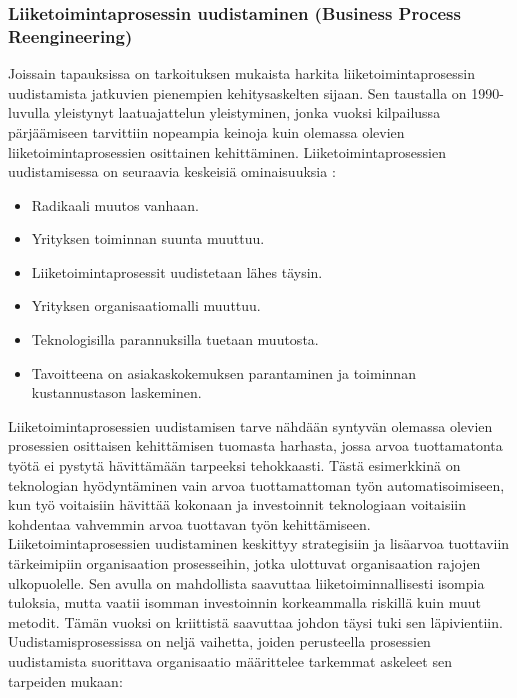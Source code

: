 \documentclass[finnish,12pt,a4paper,pdftex]{article}
\begin{document}
\subsubsection{Liiketoimintaprosessin uudistaminen (Business Process Reengineering)}

Joissain tapauksissa on tarkoituksen mukaista harkita liiketoimintaprosessin uudistamista jatkuvien pienempien kehitysaskelten sijaan. Sen taustalla on 1990-luvulla yleistynyt laatuajattelun yleistyminen, jonka vuoksi kilpailussa pärjäämiseen tarvittiin nopeampia keinoja kuin olemassa olevien liiketoimintaprosessien osittainen kehittäminen. Liiketoimintaprosessien uudistamisessa on seuraavia keskeisiä ominaisuuksia \citep{mohapatra}:

\begin{itemize}
\setlength{\itemsep}{0pt}
    \item Radikaali muutos vanhaan.
    \item Yrityksen toiminnan suunta muuttuu.
    \item Liiketoimintaprosessit uudistetaan lähes täysin.
    \item Yrityksen organisaatiomalli muuttuu.
    \item Teknologisilla parannuksilla tuetaan muutosta.
    \item Tavoitteena on asiakaskokemuksen parantaminen ja toiminnan kustannustason laskeminen.
\end{itemize}

Liiketoimintaprosessien uudistamisen tarve nähdään syntyvän olemassa olevien prosessien osittaisen kehittämisen tuomasta harhasta, jossa arvoa tuottamatonta työtä ei pystytä hävittämään tarpeeksi tehokkaasti. Tästä esimerkkinä on teknologian hyödyntäminen vain arvoa tuottamattoman työn automatisoimiseen, kun työ voitaisiin hävittää kokonaan ja investoinnit teknologiaan voitaisiin kohdentaa vahvemmin arvoa tuottavan työn kehittämiseen. \citep{hammer}\\

Liiketoimintaprosessien uudistaminen keskittyy strategisiin ja lisäarvoa tuottaviin tärkeimipiin organisaation prosesseihin, jotka ulottuvat organisaation rajojen ulkopuolelle. Sen avulla on mahdollista saavuttaa liiketoiminnallisesti isompia tuloksia, mutta vaatii isomman investoinnin korkeammalla riskillä kuin muut metodit. Tämän vuoksi on kriittistä saavuttaa johdon täysi tuki sen läpivientiin.\\

Uudistamisprosessissa on neljä vaihetta, joiden perusteella prosessien uudistamista suorittava organisaatio määrittelee tarkemmat askeleet sen tarpeiden mukaan: \citep{mohapatra}
\end{document}
